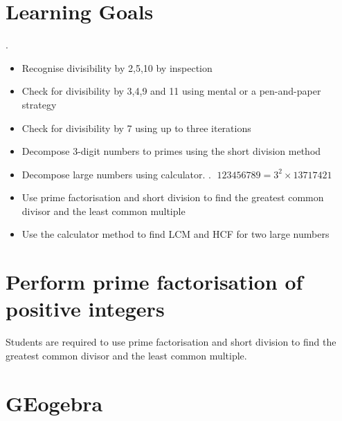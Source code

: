 






\section{Learning Goals}
\begin{tcolorbox}
 \textbf{\learninggoals}.
\tcblower
\begin{itemize}
\item Recognise   divisibility by  2,5,10 by inspection
\item Check for divisibility by 3,4,9 and 11 using mental or a pen-and-paper strategy
\item Check for divisibility by 7 using up to three iterations
\item Decompose  3-digit numbers to primes using the short division method
\item Decompose large numbers using calculator. \ie.  $\;123456789=3^2\times13717421$ 
\item Use prime
factorisation and short division to find the
greatest common divisor and the least
common multiple
\item Use the calculator method to find LCM and HCF for two  large numbers
\end{itemize}
\end{tcolorbox}


\section{Perform prime factorisation of positive integers}
Students are required to use prime
factorisation and short division to find the
greatest common divisor and the least
common multiple.
\section{GEogebra}

